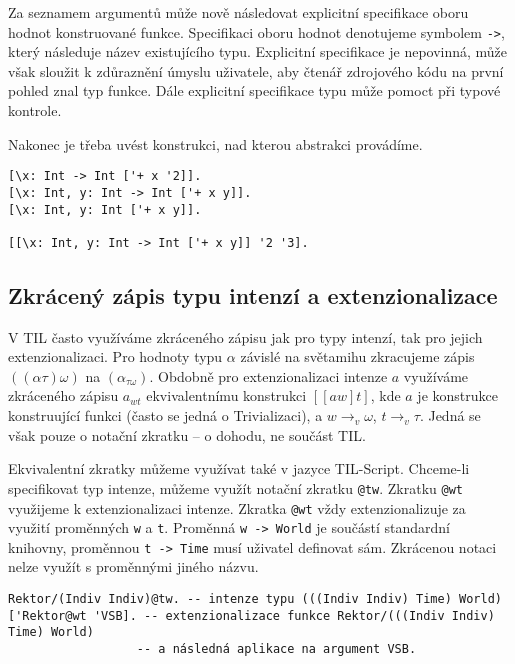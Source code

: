 Za seznamem argumentů může nově následovat explicitní specifikace oboru hodnot konstruované funkce.
Specifikaci oboru hodnot denotujeme symbolem \lstinline{->}, který následuje název existujícího
typu. Explicitní specifikace je nepovinná, může však sloužit k zdůraznění úmyslu uživatele, aby
čtenář zdrojového kódu na první pohled znal typ funkce. Dále explicitní specifikace typu může
pomoct při typové kontrole.

Nakonec je třeba uvést konstrukci, nad kterou abstrakci provádíme.

\begin{lstlisting}[caption={Příklad využití Uzávěrů}]
[\x: Int -> Int ['+ x '2]].
[\x: Int, y: Int -> Int ['+ x y]].
[\x: Int, y: Int ['+ x y]].

[[\x: Int, y: Int -> Int ['+ x y]] '2 '3].
\end{lstlisting}

\subsection{Zkrácený zápis typu intenzí a extenzionalizace}

V TIL často využíváme zkráceného zápisu jak pro typy intenzí, tak pro jejich extenzionalizaci.
Pro hodnoty typu $\alpha$ závislé na světamihu zkracujeme zápis $((\alpha\tau)\omega)$
na $(\alpha_{\tau\omega})$. Obdobně pro extenzionalizaci intenze $a$ využíváme zkráceného zápisu
$a_{wt}$ ekvivalentnímu konstrukci $[[a w] t]$, kde $a$ je konstrukce konstruující funkci
(často se jedná o Trivializaci), a $w \rightarrow_v \omega$, $t \rightarrow_v \tau$. Jedná
se však pouze o notační zkratku -- o dohodu, ne součást TIL.

Ekvivalentní zkratky můžeme využívat také v jazyce TIL-Script. Chceme-li specifikovat typ intenze,
můžeme využít notační zkratku \lstinline{@tw}. Zkratku \lstinline{@wt} využijeme k extenzionalizaci
intenze. Zkratka \lstinline{@wt} vždy extenzionalizuje za využití proměnných \lstinline{w} a
\lstinline{t}. Proměnná \lstinline{w -> World} je součástí standardní knihovny, proměnnou
\lstinline{t -> Time} musí uživatel definovat sám. Zkrácenou notaci nelze využít s proměnnými
jiného názvu.

\begin{lstlisting}[caption={Příklad využití zkrácené notace}]
Rektor/(Indiv Indiv)@tw. -- intenze typu (((Indiv Indiv) Time) World)
['Rektor@wt 'VSB]. -- extenzionalizace funkce Rektor/(((Indiv Indiv) Time) World)
                  -- a následná aplikace na argument VSB.
\end{lstlisting}

